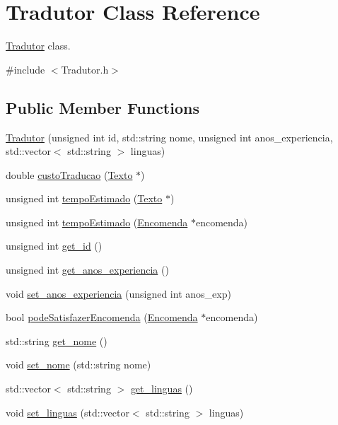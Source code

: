 \hypertarget{class_tradutor}{\section{Tradutor Class Reference}
\label{class_tradutor}
}


\hyperlink{class_tradutor}{Tradutor} class.  




{\ttfamily \#include $<$Tradutor.\-h$>$}

\subsection*{Public Member Functions}
\begin{DoxyCompactItemize}
\item 
\hyperlink{class_tradutor_a856f362e6c97ea42d04875e6c9d012e3}{Tradutor} (unsigned int id, std\-::string nome, unsigned int anos\-\_\-experiencia, std\-::vector$<$ std\-::string $>$ linguas)
\item 
double \hyperlink{class_tradutor_a213336fc8d553cc286688f5dbbd467c3}{custo\-Traducao} (\hyperlink{class_texto}{Texto} $\ast$)
\item 
unsigned int \hyperlink{class_tradutor_aad8db1d61a7505532cda73240d76412d}{tempo\-Estimado} (\hyperlink{class_texto}{Texto} $\ast$)
\item 
unsigned int \hyperlink{class_tradutor_acd53cf00b851be61350100c9aa6ef3c0}{tempo\-Estimado} (\hyperlink{class_encomenda}{Encomenda} $\ast$encomenda)
\item 
unsigned int \hyperlink{class_tradutor_adc3d4f5ae46ebd92072c644f9fe0e479}{get\-\_\-id} ()
\item 
unsigned int \hyperlink{class_tradutor_a001f11f69661085cb11192d3c6f5d556}{get\-\_\-anos\-\_\-experiencia} ()
\item 
void \hyperlink{class_tradutor_a938cfc1c263b3504fc4d7fbdc939b087}{set\-\_\-anos\-\_\-experiencia} (unsigned int anos\-\_\-exp)
\item 
bool \hyperlink{class_tradutor_a1d22a38c8eaa3753d44b521bb3aab2af}{pode\-Satisfazer\-Encomenda} (\hyperlink{class_encomenda}{Encomenda} $\ast$encomenda)
\item 
std\-::string \hyperlink{class_tradutor_a3547a7d337cd421be409e5bf63418964}{get\-\_\-nome} ()
\item 
void \hyperlink{class_tradutor_aa50fdceab0ca03dfe5c2a1639bc5869e}{set\-\_\-nome} (std\-::string nome)
\item 
std\-::vector$<$ std\-::string $>$ \hyperlink{class_tradutor_a011b86fa2dae11c6ccdda1cbeb844e94}{get\-\_\-linguas} ()
\item 
void \hyperlink{class_tradutor_a83ed5b48e00f3a15c579e209bb01d53f}{set\-\_\-linguas} (std\-::vector$<$ std\-::string $>$ linguas)
\end{DoxyCompactItemize}
